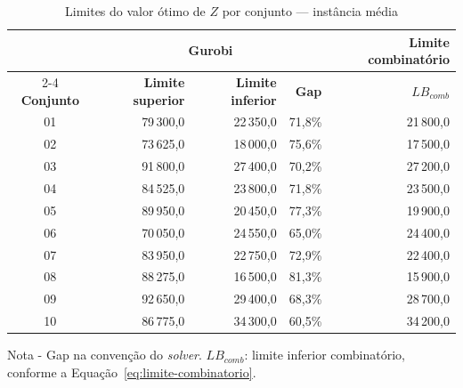 \begin{table}[htbp]
    \caption{Limites do valor ótimo de $Z$ por conjunto --- instância média}
    \label{tab:res-limites-medio}
    \centering
    \begin{tabular}{crrrr}
        \hline
        & \multicolumn{3}{c}{\textbf{Gurobi}} & \textbf{Limite combinatório} \\
        \cline{2-4} \cline{5-5}
        \textbf{Conjunto} & \textbf{Limite superior} & \textbf{Limite inferior} & \textbf{Gap} & \textbf{$LB_{comb}$} \\
        \hline
        01 & 79\,300,0 & 22\,350,0 & 71,8\% & 21\,800,0 \\
        02 & 73\,625,0 & 18\,000,0 & 75,6\% & 17\,500,0 \\
        03 & 91\,800,0 & 27\,400,0 & 70,2\% & 27\,200,0 \\
        04 & 84\,525,0 & 23\,800,0 & 71,8\% & 23\,500,0 \\
        05 & 89\,950,0 & 20\,450,0 & 77,3\% & 19\,900,0 \\
        06 & 70\,050,0 & 24\,550,0 & 65,0\% & 24\,400,0 \\
        07 & 83\,950,0 & 22\,750,0 & 72,9\% & 22\,400,0 \\
        08 & 88\,275,0 & 16\,500,0 & 81,3\% & 15\,900,0 \\
        09 & 92\,650,0 & 29\,400,0 & 68,3\% & 28\,700,0 \\
        10 & 86\,775,0 & 34\,300,0 & 60,5\% & 34\,200,0 \\
        \hline
    \end{tabular}
    \par\smallskip
    {\footnotesize Nota - Gap na convenção do \textit{solver}. $LB_{comb}$: limite inferior combinatório, conforme a Equação~\eqref{eq:limite-combinatorio}.}
\end{table}

